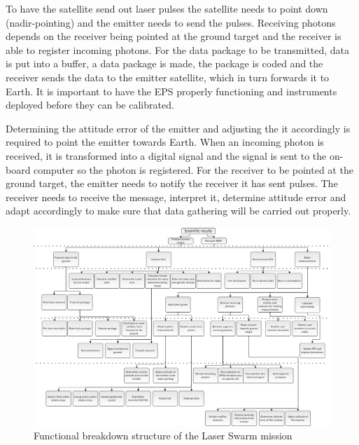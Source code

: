 To have the satellite send out laser pulses the satellite needs to point down (nadir-pointing) and the emitter needs to send the pulses. Receiving photons depends on the receiver being pointed at the ground target and the receiver is able to register incoming photons. For the data package to be transmitted, data is put into a buffer, a data package is made, the package is coded and the receiver sends the data to the emitter satellite, which in turn forwards it to Earth. It is important to have the \ac{EPS} properly functioning and instruments deployed before they can be calibrated.

Determining the attitude error of the emitter and adjusting the it accordingly is required to point the emitter towards Earth. When an incoming photon is received, it is transformed into a digital signal and the signal is sent to the on-board computer so the photon is registered. For the receiver to be pointed at the ground target, the emitter needs to notify the receiver it has sent pulses. The receiver needs to receive the message, interpret it, determine attitude error and adapt accordingly to make sure that data gathering will be carried out properly. 

\begin{landscape}
\begin{figure}[ht!]
\centering
\includegraphics[width=1.3\textheight]{chapters/img/FBD.jpg}
\caption{Functional breakdown structure of the Laser Swarm mission}
\label{FBS}
\end{figure}
\end{landscape}


